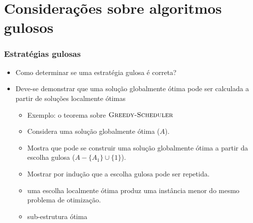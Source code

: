 \documentclass{beamer}
\begin{document}
\section{Considerações sobre algoritmos gulosos}


\begin{frame}
\frametitle{Estratégias gulosas}

\begin{itemize}
\item Como determinar se uma estratégia gulosa é correta?
\item Deve-se demonstrar que uma solução globalmente ótima pode ser
calculada a partir de soluções localmente ótimas
\begin{itemize}
\item Exemplo: o teorema sobre $\textnormal{\scshape Greedy-Scheduler}$
\item Considera uma solução globalmente ótima ($A$).
\item Mostra que pode se construir uma solução globalmente ótima a partir
da escolha gulosa ($A - \{ A_1 \} \cup \{ 1 \}$).
\item Mostrar por indução que a escolha gulosa pode ser repetida.
\item uma escolha localmente ótima produz uma instância menor do
mesmo problema de otimização.
\item \alert{sub-estrutura ótima}
\end{itemize}
\end{itemize}

\end{frame}

\end{document}
